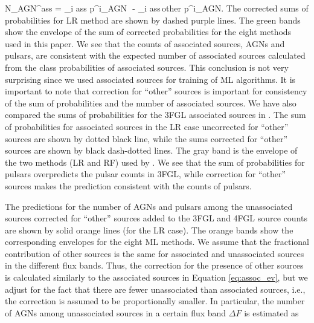 \be
{}
N_{\rm AGN}^{\rm ass}  = \sum_{i \in \rm ass} p^i_{\rm AGN}\,\, - \sum_{i \in \rm ass\,other} p^i_{\rm AGN}.
\ee
The corrected sums of probabilities for LR method are shown by dashed purple lines.
The green bands show the envelope of the sum of corrected probabilities for the eight methods used in this paper.
We see that the counts of associated sources, AGNs and pulsars, are consistent with the expected number of associated sources
calculated from the class probabilities of associated sources.
This conclusion is not very surprising since we used associated sources for training of ML algorithms.
It is important to note that correction for ``other'' sources is important for consistency of the sum of probabilities and the number of associated sources.
We have also compared the sums of probabilities for the 3FGL associated sources in \cite{2016ApJ...820....8S}.%
The sum of probabilities for associated sources in the LR case uncorrected for ``other'' sources are shown by dotted black line,
while the sums corrected for ``other'' sources are shown by black dash-dotted lines.
The gray band is the envelope of the two methods (LR and RF) used by \cite{2016ApJ...820....8S}.
We see that the sum of probabilities for pulsars overpredicts the pulsar counts in 3FGL, while correction for ``other'' sources makes the prediction consistent with the counts of pulsars.

The predictions for the number of AGNs and pulsars among the unassociated sources corrected for ``other'' sources 
added to the 3FGL and 4FGL source counts are shown by solid orange lines (for the LR case).
The orange bands show the corresponding envelopes for the eight ML methods.
We assume that the fractional contribution of other sources is the same for associated and unassociated sources in the different flux bands.
Thus, the correction for the presence of other sources is calculated similarly to the associated sources in Equation \ref{eq:assoc_ev},
but we adjust for the fact that there are fewer unassociated than associated sources, i.e., 
the correction is assumed to be proportionally smaller.
In particular, the number of AGNs among unassociated sources in a certain flux band $\Delta F$ is estimated as

